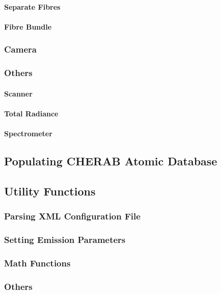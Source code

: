 \documentclass[../main.tex]{subfiles}
\begin{document}
\paragraph{Separate Fibres}
\paragraph{Fibre Bundle}
\subsubsection{Camera}
\subsubsection{Others}
\paragraph{Scanner}
\paragraph{Total Radiance}
\paragraph{Spectrometer}
\subsection{Populating CHERAB Atomic Database}
\subsection{Utility Functions}
\subsubsection{Parsing XML Configuration File}
\subsubsection{Setting Emission Parameters}
\subsubsection{Math Functions}
\subsubsection{Others}
\end{document}
